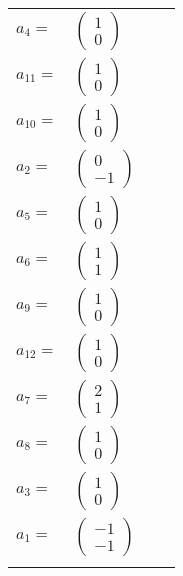 \documentclass[1p]{elsarticle_modified}
\theoremstyle{definition}
\begin{document}
\begin{tabular}{m{7pt} m{180pt} m{7pt} m{180pt} }
\flushright $a_{4}=$&$\begin{pmatrix}1\\0\end{pmatrix}$ \\
\flushright $a_{11}=$&$\begin{pmatrix}1\\0\end{pmatrix}$ \\
\flushright $a_{10}=$&$\begin{pmatrix}1\\0\end{pmatrix}$ \\
\flushright $a_{2}=$&$\begin{pmatrix}0\\-1\end{pmatrix}$ \\
\flushright $a_{5}=$&$\begin{pmatrix}1\\0\end{pmatrix}$ \\
\flushright $a_{6}=$&$\begin{pmatrix}1\\1\end{pmatrix}$ \\
\flushright $a_{9}=$&$\begin{pmatrix}1\\0\end{pmatrix}$ \\
\flushright $a_{12}=$&$\begin{pmatrix}1\\0\end{pmatrix}$ \\
\flushright $a_{7}=$&$\begin{pmatrix}2\\1\end{pmatrix}$ \\
\flushright $a_{8}=$&$\begin{pmatrix}1\\0\end{pmatrix}$ \\
\flushright $a_{3}=$&$\begin{pmatrix}1\\0\end{pmatrix}$ \\
\flushright $a_{1}=$&$\begin{pmatrix}-1\\-1\end{pmatrix}$\\&\end{tabular}
\end{document}
